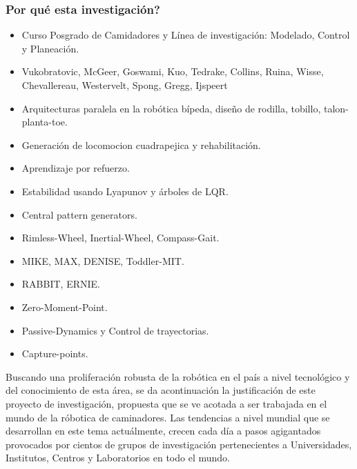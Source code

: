 {\begin{frame}
{  }
\end{frame}
\begin{frame}
  \frametitle{Por qu\'e esta investigaci\'on?}
  \begin{itemize}
  \item Curso Posgrado de Camidadores y L\'inea de investigaci\'on: Modelado, Control y Planeaci\'on.
  \item Vukobratovic, McGeer, Goswami, Kuo, Tedrake, Collins, Ruina, Wisse, Chevallereau, Westervelt, Spong, Gregg, Ijspeert
  \item Arquitecturas paralela en la rob\'otica b\'ipeda, dise\~no de rodilla, tobillo, talon-planta-toe.
  \item Generaci\'on de locomocion cuadrapejica y rehabilitaci\'on.
  \item Aprendizaje por refuerzo.
  \item Estabilidad usando Lyapunov y \'arboles de LQR.
  \item Central pattern generators.
  \item Rimless-Wheel, Inertial-Wheel, Compass-Gait. 
  \item MIKE, MAX, DENISE, Toddler-MIT.
  \item RABBIT, ERNIE.
  \item Zero-Moment-Point.
  \item Passive-Dynamics y Control de trayectorias.
  \item Capture-points.
  \end{itemize}
\end{frame}
}
Buscando una proliferaci\'on robusta de la rob\'otica en el pa\'is a nivel tecnol\'ogico y del conocimiento de esta \'area, se da acontinuaci\'on la justificaci\'on de este proyecto de investigaci\'on, propuesta que se ve acotada a ser trabajada en el mundo de la r\'obotica de caminadores.  Las tendencias a nivel mundial que se desarrollan en este tema actu\'almente, crecen cada d\'ia a pasos agigantados provocados por cientos de grupos de investigaci\'on pertenecientes a Universidades, Institutos, Centros y Laboratorios en todo el mundo.\par
